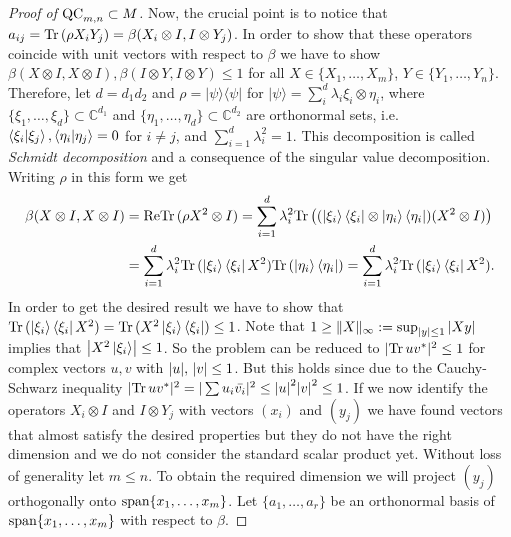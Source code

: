 \begin{proof}[Proof of $ \textup{QC}_{m,n} \subset M $]
	\noindent Now, the crucial point is to notice that $ a_{ij} =\text{Tr} \, {(\rho X_i Y_j)} =  \beta(X_i \otimes I,I \otimes Y_j) $. In order to show that these operators coincide with unit vectors with respect to $  \beta  $ we have to show
	$ \beta(X \otimes I, X \otimes I), \beta(I \otimes Y, I \otimes Y) \le 1$ for all $ X \in \{X_1,\hdots,X_m \} $, $ Y \in \{Y_1,\hdots,Y_n \} $. 
	Therefore, let $ d = d_1d_2 $ and $ \rho = \vert \psi \rangle \langle \psi \vert $ for $ \vert \psi \rangle = \sum_{i}^{d}\lambda_i \xi_i \otimes \eta_i $, where $ \{ \xi_1,\hdots,\xi_d \} \subset \mathbb{C}^{d_1}$ and $ \{  \eta_1,\hdots,\eta_d\} \subset \mathbb{C}^{d_2}$ are orthonormal sets, i.e. $ \braket{\xi_i \vert \xi_j}, \braket{\eta_i \vert \eta_j} = 0 $ for $ i \neq j $, and $ \sum_{i=1}^d \lambda_i^2 = 1 $. This decomposition is called {\itshape Schmidt decomposition} and a consequence of the singular value decomposition. Writing $ \rho $ in this form we get 
	\begin{align*}
	\beta(X \otimes I, X \otimes I) &= \textup{Re} \text{Tr} \, {(\rho X^2 \otimes I)} =  \sum_{i=1}^d \lambda_i^2 \text{Tr} \, {\big ((\ket{\xi_i} \bra{\xi_i} \otimes \ket{\eta_i}\bra{\eta_i})(X^2 \otimes I)\big ) }  \\
	&= \sum_{i=1}^{d}\lambda_i^2 \text{Tr} \, {(\ket{\xi_i} \bra{\xi_i}X^2)} \text{Tr} \, {(\ket{\eta_i}\bra{\eta_i})}  =  \sum_{i=1}^{d}\lambda_i^2 \text{Tr} \, {(\ket{\xi_i} \bra{\xi_i}X^2)} .
	\end{align*}
	In order to get the desired result we have to show that $ \text{Tr} \, {(\ket{\xi_i} \bra{\xi_i}X^2)}  = \text{Tr} \, {(X^2\ket{\xi_i} \bra{\xi_i})}  \le 1 $. 
	Note that $1 \ge  \Vert {X} \Vert_{\infty} := \sup_{{\left|{y}\right|}\le 1} {\left|{Xy}\right|} $ implies that $ {\left|{X^2\ket{\xi_i}}\right|} \le 1 $. So the problem can be reduced to $ \vert \text{Tr} \, {uv^*} \vert^2 \le 1 $ for complex vectors $ u,v $ with $ {\left|{u}\right|},\, {\left|{v}\right|} \le 1 $. But this holds since due to the Cauchy-Schwarz inequality 
	$ \vert\text{Tr} \, {uv^*} \vert^2 = \vert\sum u_i \bar{v_i}\vert^2 \le {\left|{u}\right|}^2{\left|{v}\right|}^2 \le 1 $.
	\noindent If we now identify the operators $ X_i \otimes I $ and $  I \otimes Y_j$ with vectors
	$ (x_i) $ and $ (y_j) $ we have found vectors that almost satisfy the desired properties but they do not have the right dimension and we do not consider the standard scalar product yet. Without loss of generality let $ m \le n $. To obtain the required dimension we will project $ (y_j) $ orthogonally onto $ \textup{span}\{ x_1,\hdots,x_m \} $.
	Let $ \{a_1,\hdots,a_r\} $ be an orthonormal basis of $ \textup{span} \{ x_1,\hdots,x_m \} $ with respect to $ \beta $. 

\end{proof}
